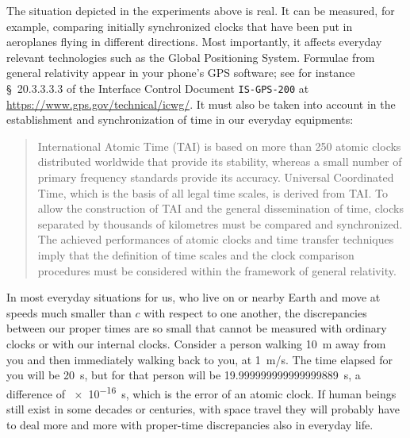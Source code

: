 \documentclass[a4paper,12pt,%
onecolumn,oneside,titlepage,%
british%
]{memoir}
\renewcommand*{\|}[1][]{\nonscript\:#1\vert\nonscript\:\mathopen{}}
\newcommand*{\sect}{\S}%
\begin{document}
The situation depicted in the experiments above is real. It can be measured, for example, comparing initially synchronized clocks that have been put in aeroplanes flying in different directions. Most importantly, it affects everyday relevant technologies such as the Global Positioning System. Formulae from general relativity appear in your phone's GPS software; see for instance \sect~20.3.3.3.3 of the Interface Control Document \texttt{IS-GPS-200} at \url{https://www.gps.gov/technical/icwg/}. It must also be taken into account in the establishment and synchronization of time in our everyday equipments:
\begin{quote}\footnotesize
  International Atomic Time (TAI) is based on more than 250 atomic clocks distributed worldwide that provide its stability, whereas a small number of primary frequency standards provide its accuracy. Universal Coordinated Time, which is the basis of all legal time scales, is derived from TAI. To allow the construction of TAI and the general dissemination of time, clocks separated by thousands of kilometres must be compared and synchronized. \textelp{} The achieved performances of atomic clocks and time transfer techniques imply that the definition of time scales and the clock comparison procedures must be considered within the framework of general relativity. 
\end{quote}

In most everyday situations for us, who live on or nearby Earth and move at speeds much smaller than $c$ with respect to one another, the discrepancies between our proper times are so small that cannot be
measured with ordinary clocks or with our internal clocks. Consider a
person walking \qty{10}{m} away from you and then immediately walking back
to you, at \qty{1}{m/s}. The time elapsed for you will be \qty{20}{s}, but for that person
will be \qty{19.999999999999999889}{s}, a difference of \qty{e-16}{s}, which is the error of an atomic clock. %
If human beings still exist in some decades or centuries, with space travel they will probably have to deal more and more with proper-time discrepancies also in everyday life.
\end{document}
